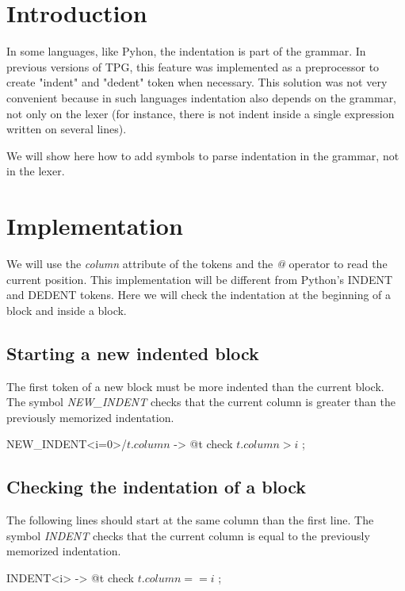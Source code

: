 \section{Introduction}

In some languages, like Pyhon, the indentation is part of the grammar.
In previous versions of TPG, this feature was implemented as a preprocessor to create "indent" and "dedent" token when necessary.
This solution was not very convenient because in such languages indentation also depends on the grammar, not only on the lexer (for instance, there is not indent inside a single expression written on several lines).

We will show here how to add symbols to parse indentation in the grammar, not in the lexer.

\section{Implementation}

We will use the \emph{column} attribute of the tokens and the \emph{@} operator to read the current position.
This implementation will be different from Python's INDENT and DEDENT tokens.
Here we will check the indentation at the beginning of a block and inside a block.

\subsection{Starting a new indented block}

The first token of a new block must be more indented than the current block.
The symbol \emph{NEW\_INDENT} checks that the current column is greater than the previously memorized indentation.

\begin{verbatimtab}[4]
        NEW_INDENT<i=0>/$t.column$ -> @t check $t.column>i$ ;
\end{verbatimtab}

\subsection{Checking the indentation of a block}

The following lines should start at the same column than the first line.
The symbol \emph{INDENT} checks that the current column is equal to the previously memorized indentation.

\begin{verbatimtab}[4]
        INDENT<i> -> @t check $t.column==i$ ;
\end{verbatimtab}

